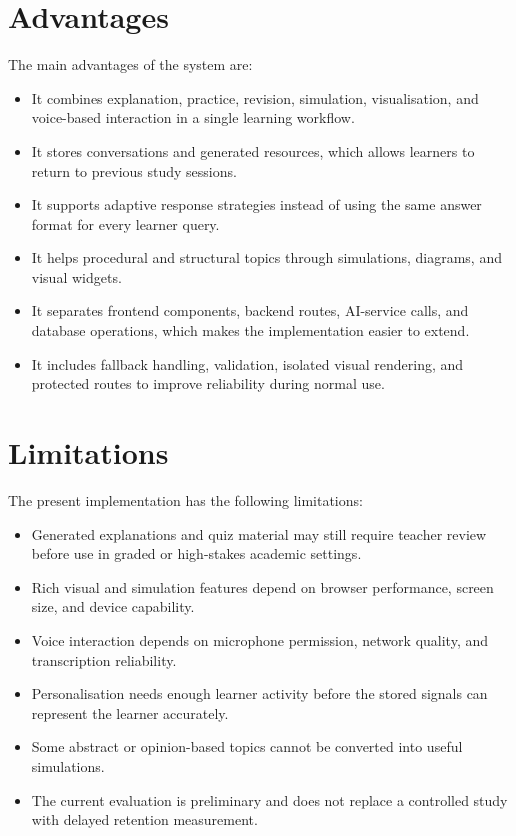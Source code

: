 \section[Advantages]{\textbf{Advantages}}
The main advantages of the system are:
\begin{itemize}[leftmargin=1.2cm]
	\item It combines explanation, practice, revision, simulation, visualisation, and voice-based interaction in a single learning workflow.
	\item It stores conversations and generated resources, which allows learners to return to previous study sessions.
	\item It supports adaptive response strategies instead of using the same answer format for every learner query.
	\item It helps procedural and structural topics through simulations, diagrams, and visual widgets.
	\item It separates frontend components, backend routes, AI-service calls, and database operations, which makes the implementation easier to extend.
	\item It includes fallback handling, validation, isolated visual rendering, and protected routes to improve reliability during normal use.
\end{itemize}

\section[Limitations]{\textbf{Limitations}}
The present implementation has the following limitations:
\begin{itemize}[leftmargin=1.2cm]
	\item Generated explanations and quiz material may still require teacher review before use in graded or high-stakes academic settings.
	\item Rich visual and simulation features depend on browser performance, screen size, and device capability.
	\item Voice interaction depends on microphone permission, network quality, and transcription reliability.
	\item Personalisation needs enough learner activity before the stored signals can represent the learner accurately.
	\item Some abstract or opinion-based topics cannot be converted into useful simulations.
	\item The current evaluation is preliminary and does not replace a controlled study with delayed retention measurement.
\end{itemize}

